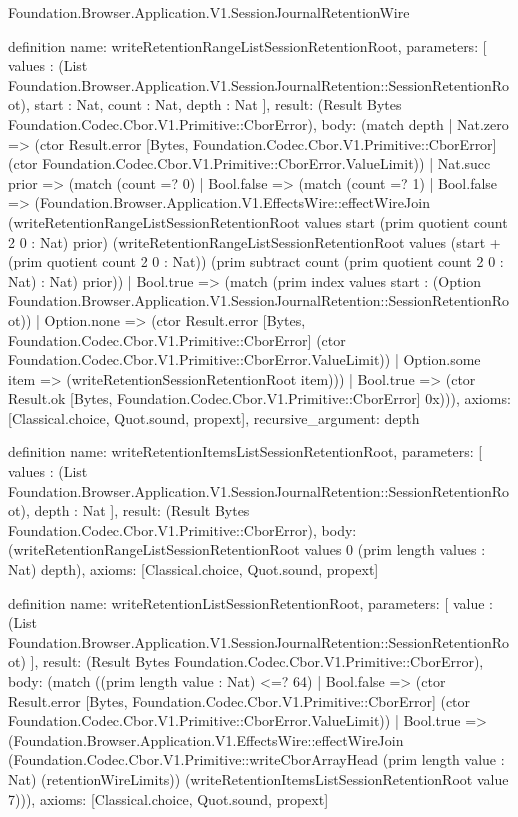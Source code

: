 \begin{lexlean}{Foundation.Browser.Application.V1.SessionJournalRetentionWire}
\begin{semanticmodule}
definition{
  name: writeRetentionRangeListSessionRetentionRoot,
  parameters: [
    values : (List Foundation.Browser.Application.V1.SessionJournalRetention::SessionRetentionRoot),
    start : Nat,
    count : Nat,
    depth : Nat
  ],
  result: (Result Bytes Foundation.Codec.Cbor.V1.Primitive::CborError),
  body: (match depth
    | Nat.zero => (ctor Result.error [Bytes, Foundation.Codec.Cbor.V1.Primitive::CborError] (ctor Foundation.Codec.Cbor.V1.Primitive::CborError.ValueLimit))
    | Nat.succ prior => (match (count =? 0)
      | Bool.false => (match (count =? 1)
        | Bool.false => (Foundation.Browser.Application.V1.EffectsWire::effectWireJoin (writeRetentionRangeListSessionRetentionRoot values start (prim quotient count 2 0 : Nat) prior) (writeRetentionRangeListSessionRetentionRoot values (start + (prim quotient count 2 0 : Nat)) (prim subtract count (prim quotient count 2 0 : Nat) : Nat) prior))
        | Bool.true => (match (prim index values start : (Option Foundation.Browser.Application.V1.SessionJournalRetention::SessionRetentionRoot))
          | Option.none => (ctor Result.error [Bytes, Foundation.Codec.Cbor.V1.Primitive::CborError] (ctor Foundation.Codec.Cbor.V1.Primitive::CborError.ValueLimit))
          | Option.some item => (writeRetentionSessionRetentionRoot item)))
      | Bool.true => (ctor Result.ok [Bytes, Foundation.Codec.Cbor.V1.Primitive::CborError] 0x))),
  axioms: [Classical.choice, Quot.sound, propext],
  recursive_argument: depth
}

definition{
  name: writeRetentionItemsListSessionRetentionRoot,
  parameters: [
    values : (List Foundation.Browser.Application.V1.SessionJournalRetention::SessionRetentionRoot),
    depth : Nat
  ],
  result: (Result Bytes Foundation.Codec.Cbor.V1.Primitive::CborError),
  body: (writeRetentionRangeListSessionRetentionRoot values 0 (prim length values : Nat) depth),
  axioms: [Classical.choice, Quot.sound, propext]
}

definition{
  name: writeRetentionListSessionRetentionRoot,
  parameters: [
    value : (List Foundation.Browser.Application.V1.SessionJournalRetention::SessionRetentionRoot)
  ],
  result: (Result Bytes Foundation.Codec.Cbor.V1.Primitive::CborError),
  body: (match ((prim length value : Nat) <=? 64)
    | Bool.false => (ctor Result.error [Bytes, Foundation.Codec.Cbor.V1.Primitive::CborError] (ctor Foundation.Codec.Cbor.V1.Primitive::CborError.ValueLimit))
    | Bool.true => (Foundation.Browser.Application.V1.EffectsWire::effectWireJoin (Foundation.Codec.Cbor.V1.Primitive::writeCborArrayHead (prim length value : Nat) (retentionWireLimits)) (writeRetentionItemsListSessionRetentionRoot value 7))),
  axioms: [Classical.choice, Quot.sound, propext]
}


\end{semanticmodule}
\end{lexlean}
